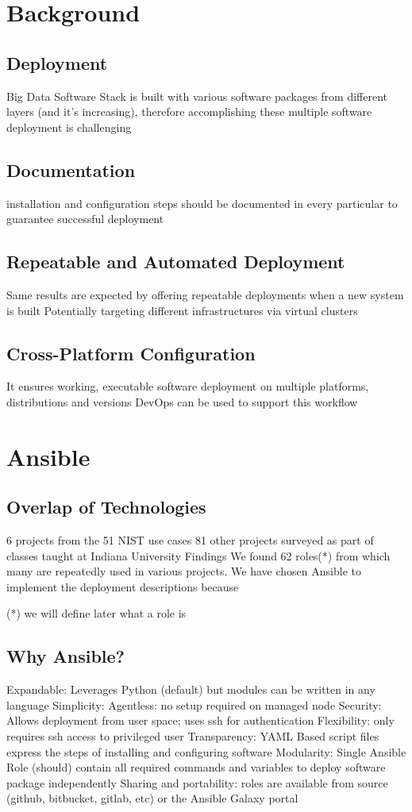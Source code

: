 

\section{Background}

\subsection{Deployment}

Big Data Software Stack is built with various software packages from different layers (and it’s increasing), therefore accomplishing these multiple software deployment is challenging
\subsection{Documentation}
installation and configuration steps should be documented in every particular to guarantee successful deployment
\subsection{Repeatable and Automated Deployment}
Same results are expected by offering repeatable deployments when a new system is built
Potentially targeting different infrastructures via virtual clusters
\subsection{Cross-Platform Configuration}
It ensures working, executable software deployment on multiple platforms, distributions and versions
DevOps can be used to support this workflow


\section{Ansible}

\subsection{Overlap of Technologies}
6 projects from the 51 NIST use cases
81 other projects surveyed as part of classes taught at Indiana University
Findings
We found 62 roles(*) from which many are repeatedly used in various projects. 
We have chosen Ansible to implement the deployment descriptions because 

(*) we will define later what a role is

\subsection{Why Ansible?}
Expandable: Leverages Python (default) but modules can be written in any language
Simplicity: 
Agentless: no setup required on managed node
Security: Allows deployment from user space; uses ssh for authentication
Flexibility: only requires ssh access to privileged user
Transparency: YAML Based script files express the steps of installing and configuring software
Modularity: Single Ansible Role (should) contain all required commands and variables to deploy software package independently
Sharing and portability: roles are available from source (github, bitbucket, gitlab, etc) or the Ansible Galaxy portal


